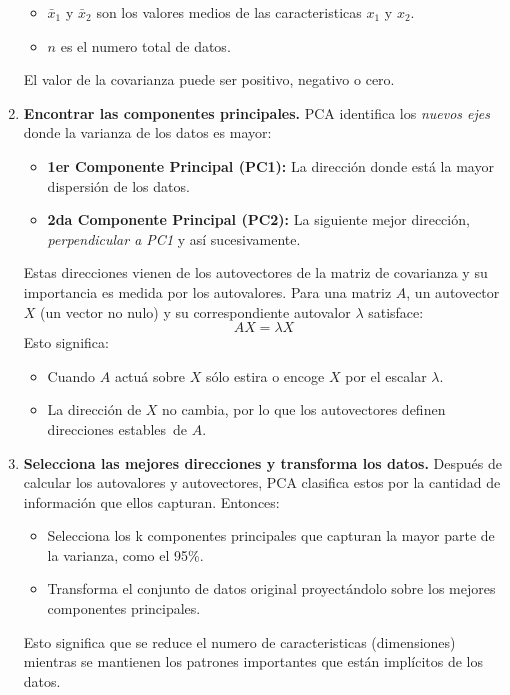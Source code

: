 \documentclass[12pt,letterpaper,oneside,openright]{book}
\begin{document}
\begin{enumerate}
\begin{itemize}
			\item $\bar{x}_1$ y $\bar{x}_2$ son los valores medios de las caracteristicas $x_1$ y $x_2$.
			\item $n$ es el numero total de datos.
		\end{itemize}
		El valor de la covarianza puede ser positivo, negativo o cero.
		\item \textbf{Encontrar las componentes principales.}
		PCA identifica los \textit{nuevos ejes} donde la varianza de los datos es mayor:
		\begin{itemize}
			\item \textbf{1er Componente Principal (PC1):} La dirección donde está la mayor dispersión de los datos.
			\item \textbf{2da Componente Principal (PC2):} La siguiente mejor dirección, \textit{perpendicular a PC1} y así sucesivamente.
		\end{itemize}
		Estas direcciones vienen de los autovectores de la matriz de covarianza y su importancia es medida por los autovalores. Para una matriz $A$, un autovector $X$ (un vector no nulo) y su correspondiente autovalor $\lambda$ satisface:
		\begin{equation}
			\label{eq:autovalores}
			AX = \lambda X
		\end{equation}
		Esto significa:
		\begin{itemize}
			\item Cuando $A$ actuá sobre $X$ sólo estira o encoge $X$ por el escalar $\lambda$.
			\item La dirección de $X$ no cambia, por lo que los autovectores definen \guillemetleft direcciones estables\guillemetright \ de $A$.
		\end{itemize}
		\item \textbf{Selecciona las mejores direcciones y transforma los datos.}
		Después de calcular los autovalores y autovectores, PCA clasifica estos por la cantidad de información que ellos capturan. Entonces: 
		\begin{itemize}
			\item Selecciona los k componentes principales que capturan la mayor parte de la varianza, como el 95\%.
			\item Transforma el conjunto de datos original proyectándolo sobre los mejores componentes principales. 
		\end{itemize}
		Esto significa que se reduce el numero de caracteristicas (dimensiones) mientras se mantienen los patrones importantes que están implícitos de los datos.
	\end{enumerate}
	
\end{document}
